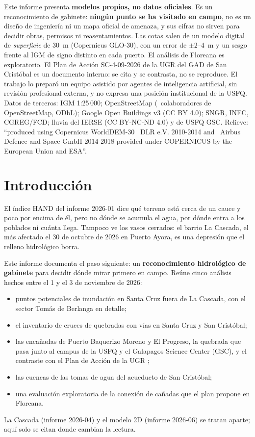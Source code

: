 \documentclass{sosg-informe}
\begin{document}
\begin{aviso}
Este informe presenta \textbf{modelos propios, no datos oficiales}. Es un reconocimiento de gabinete: \textbf{ningún punto se ha visitado en campo}, no es un diseño de ingeniería ni un mapa oficial de amenaza, y sus cifras no sirven para decidir obras, permisos ni reasentamientos. Las cotas salen de un modelo digital de \emph{superficie} de 30~m (Copernicus GLO-30), con un error de $\pm 2$--4~m y un sesgo frente al IGM de signo distinto en cada puerto. El análisis de Floreana es exploratorio. El Plan de Acción SC-4-09-2026 de la UGR del GAD de San Cristóbal es un documento interno: se cita y se contrasta, no se reproduce. El trabajo lo preparó un equipo asistido por agentes de inteligencia artificial, sin revisión profesional externa, y no expresa una posición institucional de la USFQ. Datos de terceros: IGM 1:25\,000; OpenStreetMap (\textcopyright\ colaboradores de OpenStreetMap, ODbL); Google Open Buildings v3 (CC BY 4.0); SNGR, INEC, CGREG/FCD; lluvia del IERSE (CC BY-NC-ND 4.0) y de USFQ GSC. Relieve: \enquote{produced using Copernicus WorldDEM-30 \textcopyright\ DLR e.V. 2010-2014 and \textcopyright\ Airbus Defence and Space GmbH 2014-2018 provided under COPERNICUS by the European Union and ESA}.
\end{aviso}

\section{Introducción}

El índice HAND del informe 2026-01 dice qué terreno está cerca de un cauce y poco por encima de él, pero no dónde se acumula el agua, por dónde entra a los poblados ni cuánta llega. Tampoco ve los vasos cerrados: el barrio La Cascada, el más afectado el 30 de octubre de 2026 en Puerto Ayora, es una depresión que el relleno hidrológico borra.

Este informe documenta el paso siguiente: un \textbf{reconocimiento hidrológico de gabinete} para decidir dónde mirar primero en campo. Reúne cinco análisis hechos entre el 1 y el 3 de noviembre de 2026:
\begin{itemize}
  \item puntos potenciales de inundación en Santa Cruz fuera de La Cascada, con el sector Tomás de Berlanga en detalle;
  \item el inventario de cruces de quebradas con vías en Santa Cruz y San Cristóbal;
  \item las encañadas de Puerto Baquerizo Moreno y El Progreso, la quebrada que pasa junto al campus de la USFQ y el Galapagos Science Center (GSC), y el contraste con el Plan de Acción de la UGR \citep{ugr2026};
  \item las cuencas de las tomas de agua del acueducto de San Cristóbal;
  \item una evaluación exploratoria de la conexión de cañadas que el plan propone en Floreana.
\end{itemize}
La Cascada (informe 2026-04) y el modelo 2D (informe 2026-06) se tratan aparte; aquí solo se citan donde cambian la lectura.
\end{document}
